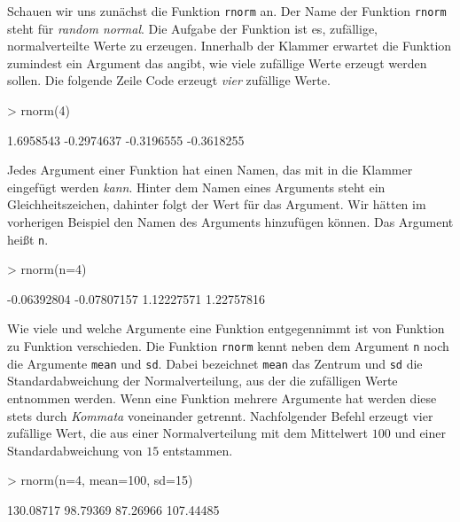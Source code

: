 Schauen wir uns zunächst die Funktion \verb!rnorm! an. Der Name der Funktion \verb!rnorm! steht für \emph{random normal}. Die Aufgabe der Funktion ist es, zufällige, normalverteilte Werte zu erzeugen. Innerhalb der Klammer erwartet die Funktion zumindest ein Argument das angibt, wie viele zufällige Werte erzeugt werden sollen. Die folgende Zeile Code erzeugt \emph{vier} zufällige Werte. 

\begin{Schunk}
\begin{Sinput}
> rnorm(4)
\end{Sinput}
\begin{Soutput}
[1]  1.6958543 -0.2974637 -0.3196555 -0.3618255
\end{Soutput}
\end{Schunk}

Jedes Argument einer Funktion hat einen Namen, das mit in die Klammer eingefügt werden \emph{kann}. Hinter dem Namen eines Arguments steht ein Gleichheitszeichen, dahinter folgt der Wert für das Argument. Wir hätten im vorherigen Beispiel den Namen des Arguments hinzufügen können. Das Argument heißt \verb!n!.

\begin{Schunk}
\begin{Sinput}
> rnorm(n=4)
\end{Sinput}
\begin{Soutput}
[1] -0.06392804 -0.07807157  1.12227571  1.22757816
\end{Soutput}
\end{Schunk}

Wie viele und welche Argumente eine Funktion entgegennimmt ist von Funktion zu Funktion verschieden. Die Funktion \verb!rnorm! kennt neben dem Argument \verb!n! noch die Argumente \verb!mean! und \verb!sd!. Dabei bezeichnet \verb!mean! das Zentrum und \verb!sd! die Standardabweichung der Normalverteilung, aus der die zufälligen Werte entnommen werden. Wenn eine Funktion mehrere Argumente hat werden diese stets durch  \emph{Kommata} voneinander getrennt. Nachfolgender Befehl erzeugt vier zufällige Wert, die aus einer Normalverteilung mit dem Mittelwert $100$ und einer Standardabweichung von $15$ entstammen.

\begin{Schunk}
\begin{Sinput}
> rnorm(n=4, mean=100, sd=15)
\end{Sinput}
\begin{Soutput}
[1] 130.08717  98.79369  87.26966 107.44485
\end{Soutput}
\end{Schunk}

